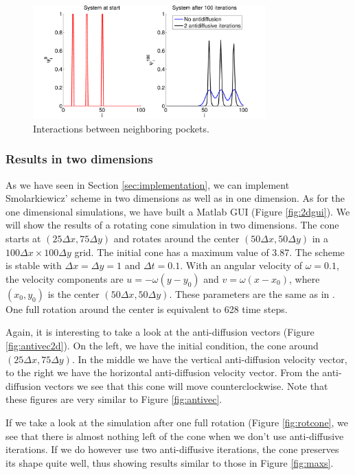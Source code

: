 \documentclass[10pt, a4paper]{article}
\begin{document}
\begin{figure}[htp]
\centering
 \includegraphics[width=0.8\textwidth]{../presentation/animation/peaks-eps-converted-to.pdf}
 \caption{Interactions between neighboring pockets.}
\label{fig:local}
\end{figure}

\subsubsection{Results in two dimensions}

As we have seen in Section \ref{sec:implementation}, we can implement Smolarkiewicz' scheme in two dimensions as well as in one dimension. As for the one dimensional simulations, we have built a Matlab GUI (Figure \ref{fig:2dgui}). We will show the results of a rotating cone simulation in two dimensions. The cone starts at $(25\Delta x, 75\Delta y)$ and rotates around the center $(50 \Delta x, 50 \Delta y)$ in a $100 \Delta x \times 100 \Delta y$ grid. The initial cone has a maximum value of 3.87. The scheme is stable with $\Delta x = \Delta y = 1$ and $\Delta t = 0.1$. With an angular velocity of $\omega = 0.1$, the velocity components are $u=-\omega(y-y_0)$ and $v=\omega(x-x_0)$, where $(x_0,y_0)$ is the center $(50 \Delta x, 50 \Delta y)$. These parameters are the same as in \cite{smolarki}. One full rotation around the center is equivalent to 628 time steps.

Again, it is interesting to take a look at the anti-diffusion vectors (Figure \ref{fig:antivec2d}). On the left, we have the initial condition, the cone around $(25\Delta x, 75\Delta y)$. In the middle we have the vertical anti-diffusion velocity vector, to the right we have the horizontal anti-diffusion velocity vector. From the anti-diffusion vectors we see that this cone will move counterclockwise. Note that these figures are very similar to Figure \ref{fig:antivec}.

If we take a look at the simulation after one full rotation (Figure \ref{fig:rotcone}, we see that there is almost nothing left of the cone when we don't use anti-diffusive iterations. If we do however use two anti-diffusive iterations, the cone preserves its shape quite well, thus showing results similar to those in Figure \ref{fig:maxs}.
\end{document}
